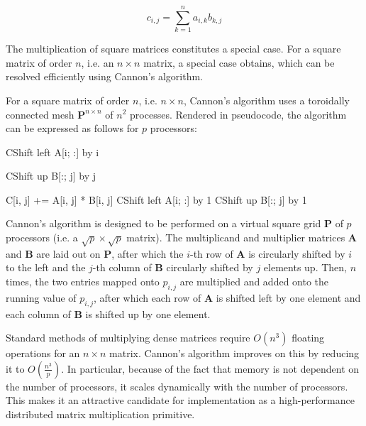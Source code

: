 \documentclass[fleqn,10pt]{SelfArx} %
\begin{document}
\begin{equation}
	c_{i, j} = \sum_{k = 1}^n a_{i, k} b_{k, j}
\end{equation}

The multiplication of square matrices constitutes a special case. For a square matrix of order $n$, i.e. an $n \times n$ matrix, a special case obtains, which can be resolved efficiently using Cannon's algorithm.\cite{cannon1969cellular} 

For a square matrix of order $n$, i.e. $n \times n$, Cannon's algorithm uses a toroidally connected mesh $\mathbf{P}^{n \times n}$ of $n^2$ processes. Rendered in pseudocode, the algorithm can be expressed as follows for $p$ processors:

\begin{algorithmic}
		\State CShift left A[i; :] by i 
	\EndFor
	
		\State CShift up B[:; j] by j 
	\EndFor
	
			\State C[i, j] += A[i, j] * B[i, j]
			\State CShift left A[i; :] by 1
			\State CShift up B[:; j] by 1
		\EndFor
	\EndFor
\end{algorithmic}

Cannon's algorithm is designed to be performed on a virtual square grid $\mathbf{P}$ of $p$ processors (i.e. a $\sqrt{p} \times \sqrt{p}$ matrix). The multiplicand and multiplier matrices $\mathbf{A}$ and $\mathbf{B}$ are laid out on $\mathbf{P}$, after which the $i$-th row of $\mathbf{A}$ is circularly shifted by $i$ to the left and the $j$-th column of $\mathbf{B}$ circularly shifted by $j$ elements up. Then, $n$ times, the two entries mapped onto $p_{i, j}$ are multiplied and added onto the running value of $p_{i, j}$, after which each row of $\mathbf{A}$ is shifted left by one element and each column of $\mathbf{B}$ is shifted up by one element.

Standard methods of multiplying dense matrices require $O(n^3)$ floating operations for an $n \times n$ matrix. Cannon's algorithm improves on this by reducing it to $O(\frac{n^3}{p})$. In particular, because of the fact that memory is not dependent on the number of processors, it scales dynamically with the number of processors. This makes it an attractive candidate for implementation as a high-performance distributed matrix multiplication primitive.

\end{document}
